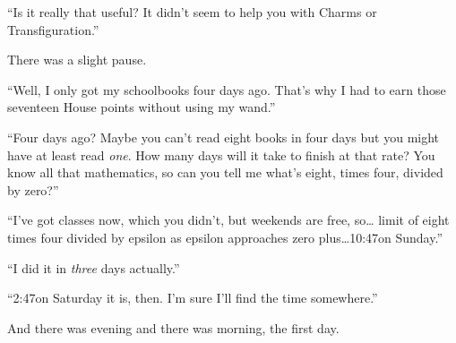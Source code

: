“Is it really that useful? It didn’t seem to help you with Charms or Transfiguration.”

There was a slight pause.

“Well, I only got my schoolbooks four days ago. That’s why I had to earn those seventeen House points without using my wand.”

“Four days ago? Maybe you can’t read eight books in four days but you might have at least read \emph{one}. How many days will it take to finish at that rate? You know all that mathematics, so can you tell me what’s eight, times four, divided by zero?”

“I’ve got classes now, which you didn’t, but weekends are free, so… limit of eight times four divided by epsilon as epsilon approaches zero plus…10:47\am on Sunday.”

“I did it in \emph{three} days actually.”

“2:47\pm on Saturday it is, then. I’m sure I’ll find the time somewhere.”

And there was evening and there was morning, the first day.

